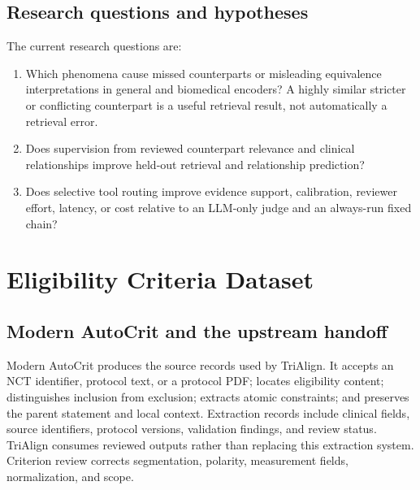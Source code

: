 \documentclass[10pt,letterpaper]{article}
\begin{document}
\subsection{Research questions and hypotheses}
The current research questions are:
\begin{enumerate}
\item Which phenomena cause missed counterparts or misleading equivalence
interpretations in general and biomedical encoders? A highly similar stricter
or conflicting counterpart is a useful retrieval result, not automatically a
retrieval error.
\item Does supervision from reviewed counterpart relevance and clinical
relationships improve held-out retrieval and relationship
prediction?
\item Does selective tool routing improve evidence support, calibration,
reviewer effort, latency, or cost relative to an LLM-only judge and an
always-run fixed chain?
\end{enumerate}

\section{Eligibility Criteria Dataset}
\label{sec:data}

\subsection{Modern AutoCrit and the upstream handoff}
Modern AutoCrit produces the source records used by TriAlign. It accepts an
NCT identifier, protocol text, or a protocol PDF; locates eligibility content;
distinguishes inclusion from exclusion; extracts atomic constraints; and
preserves the parent statement and local context. Extraction records include
clinical fields, source identifiers, protocol versions, validation findings,
and review status. TriAlign consumes reviewed outputs rather than replacing
this extraction system. Criterion review corrects segmentation, polarity, measurement fields,
normalization, and scope.
\end{document}
